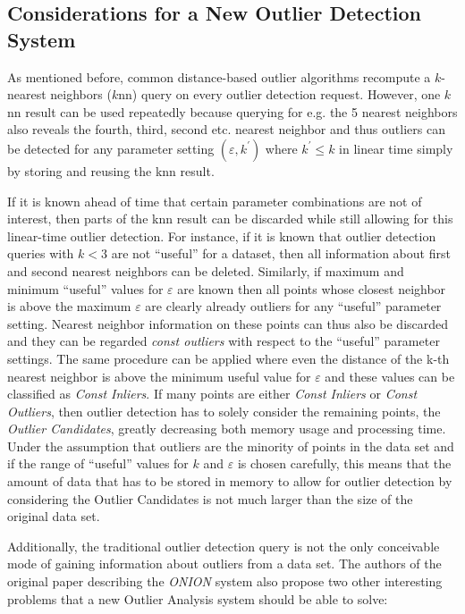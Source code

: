 \documentclass[runningheads]{llncs}
\begin{document}
\subsection{Considerations for a New Outlier Detection System}
As mentioned before, common distance-based outlier algorithms recompute a $k$-nearest neighbors ($k$nn) query on every outlier detection request. However, one $k$nn result can be used repeatedly because querying for e.g. the 5 nearest neighbors also reveals the fourth, third, second etc. nearest neighbor and thus outliers can be detected for any parameter setting $(\varepsilon,k^\prime)$ where $k^\prime \leq k$ in linear time simply by storing and reusing the knn result.

If it is known ahead of time that certain parameter combinations are not of interest, then parts of the knn result can be discarded while still allowing for this linear-time outlier detection. For instance, if it is known that outlier detection queries with $k < 3$ are not ``useful'' for a dataset, then all information about first and second nearest neighbors can be deleted. Similarly, if maximum and minimum ``useful'' values for $\varepsilon$ are known then all points whose closest neighbor is above the maximum $\varepsilon$ are clearly already outliers for any ``useful'' parameter setting. Nearest neighbor information on these points can thus also be discarded and they can be regarded \emph{const outliers} with respect to the ``useful'' parameter settings. The same procedure can be applied where even the distance of the k-th nearest neighbor is above the minimum useful value for $\varepsilon$ and these values can be classified as \emph{Const Inliers}. If many points are either \emph{Const Inliers} or \emph{Const Outliers}, then outlier detection has to solely consider the remaining points, the \emph{Outlier Candidates}, greatly decreasing both memory usage and processing time. Under the assumption that outliers are the minority of points in the data set and if the range of ``useful'' values for $k$ and $\varepsilon$ is chosen carefully, this means that the amount of data that has to be stored in memory to allow for outlier detection by considering the Outlier Candidates is not much larger than the size of the original data set.

Additionally, the traditional outlier detection query is not the only conceivable mode of gaining information about outliers from a data set. The authors of the original paper describing the \textit{ONION} system also propose two other interesting problems that a new Outlier Analysis system should be able to solve:
\end{document}
